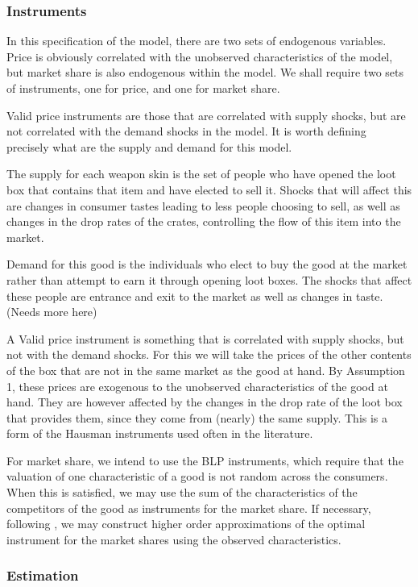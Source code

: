\documentclass[12pt]{paper}
\begin{document}
\subsubsection{Instruments}

In this specification of the model, there are two sets of endogenous
variables. Price is obviously correlated with the unobserved
characteristics of the model, but market share is also endogenous
within the model. We shall require two sets of instruments, one for
price, and one for market share.

Valid price instruments are those that are correlated with supply
shocks, but are not correlated with the demand shocks in the
model. It is worth defining precisely what are the supply and demand
for this model.

The supply for each weapon skin is the set of people who have opened
the loot box that contains that item and have elected to sell
it. Shocks that will affect this are changes in consumer tastes
leading to less people choosing to sell, as well as changes in the
drop rates of the crates, controlling the flow of this item into the
market.

Demand for this good is the individuals who elect to buy the good at
the market rather than attempt to earn it through opening loot
boxes. The shocks that affect these people are entrance and exit to
the market as well as changes in taste. (Needs more here)

A Valid price instrument is something that is correlated with supply
shocks, but not with the demand shocks. For this we will take the
prices of the other contents of the box that are not in the same
market as the good at hand. By Assumption 1, these prices are
exogenous to the unobserved characteristics of the good at hand. They
are however affected by the changes in the drop rate of the loot box
that provides them, since they come from (nearly) the same
supply. This is a form of the Hausman instruments used often in the
literature.

For market share, we intend to use the BLP instruments, which require
that the valuation of one characteristic of a good is not random
across the consumers. When this is satisfied, we may use the sum of
the characteristics of the competitors of the good as instruments for
the market share. If necessary, following \cite{OptimalBLPInstrument}, we
may construct higher order approximations of the optimal instrument
for the market shares using the observed characteristics.

\subsubsection{Estimation}
\end{document}
